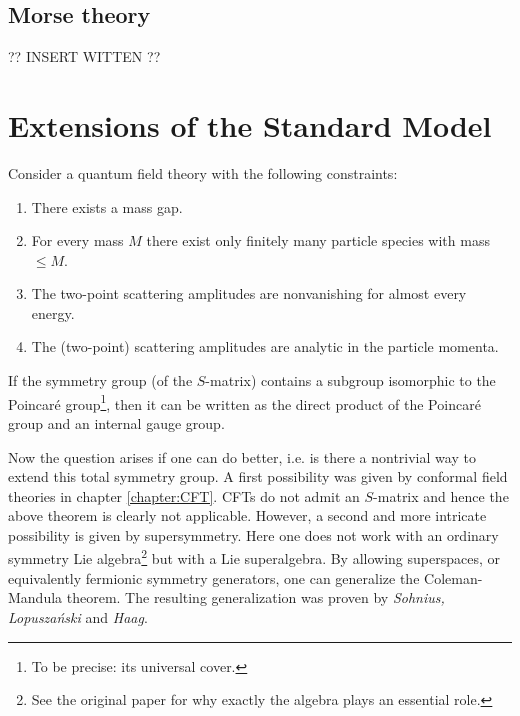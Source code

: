 \subsection{Morse theory}

    ?? INSERT WITTEN ??

\section{Extensions of the Standard Model}

    \begin{theorem}
        Consider a quantum field theory with the following constraints:
        \begin{enumerate}
            \item There exists a mass gap.
            \item For every mass $M$ there exist only finitely many particle species with mass $\leq M$.
            \item The two-point scattering amplitudes are nonvanishing for almost every energy.
            \item The (two-point) scattering amplitudes are analytic in the particle momenta.
        \end{enumerate}
        If the symmetry group (of the $S$-matrix) contains a subgroup isomorphic to the Poincar\'e group\footnote{To be precise: its universal cover.}, then it can be written as the direct product of the Poincar\'e group and an internal gauge group.
    \end{theorem}

    Now the question arises if one can do better, i.e. is there a nontrivial way to extend this total symmetry group. A first possibility was given by conformal field theories in chapter \ref{chapter:CFT}. CFTs do not admit an $S$-matrix and hence the above theorem is clearly not applicable. However, a second and more intricate possibility is given by supersymmetry. Here one does not work with an ordinary symmetry Lie algebra\footnote{See the original paper \cite{coleman_mandula} for why exactly the algebra plays an essential role.} but with a Lie superalgebra. By allowing superspaces, or equivalently fermionic symmetry generators, one can generalize the Coleman-Mandula theorem. The resulting generalization was proven by \textit{Sohnius, Lopusza\'nski} and \textit{Haag}.